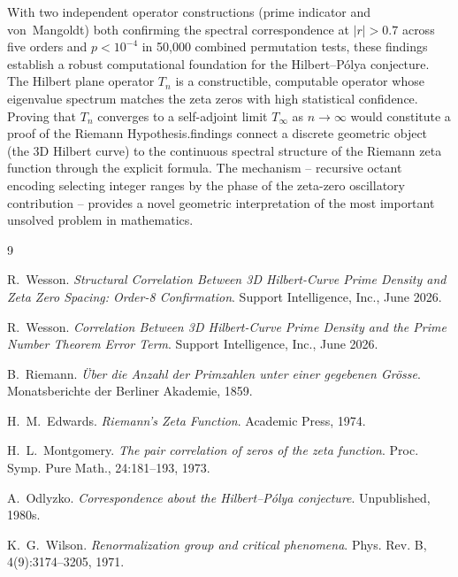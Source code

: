 \documentclass[11pt,a4paper]{article}
\begin{document}
With two independent operator constructions (prime indicator and von~Mangoldt) both confirming the spectral correspondence at $|r| > 0.7$ across five orders and $p < 10^{-4}$ in 50,000 combined permutation tests, these findings establish a robust computational foundation for the Hilbert--P\'{o}lya conjecture. The Hilbert plane operator $T_n$ is a constructible, computable operator whose eigenvalue spectrum matches the zeta zeros with high statistical confidence. Proving that $T_n$ converges to a self-adjoint limit $T_\infty$ as $n \to \infty$ would constitute a proof of the Riemann Hypothesis.\n\nThese findings connect a discrete geometric object (the 3D Hilbert curve)
to the continuous spectral structure of the Riemann zeta function through
the explicit formula. The mechanism -- recursive octant encoding selecting
integer ranges by the phase of the zeta-zero oscillatory contribution --
provides a novel geometric interpretation of the most important unsolved
problem in mathematics.

\begin{thebibliography}{9}

R.~Wesson.
\emph{Structural Correlation Between 3D Hilbert-Curve Prime Density and
Zeta Zero Spacing: Order-8 Confirmation}.
Support Intelligence, Inc., June 2026.

R.~Wesson.
\emph{Correlation Between 3D Hilbert-Curve Prime Density and the Prime
Number Theorem Error Term}.
Support Intelligence, Inc., June 2026.

B.~Riemann.
\emph{\"Uber die Anzahl der Primzahlen unter einer gegebenen Gr\"osse}.
Monatsberichte der Berliner Akademie, 1859.

H.~M.~Edwards.
\emph{Riemann's Zeta Function}.
Academic Press, 1974.

H.~L.~Montgomery.
\emph{The pair correlation of zeros of the zeta function}.
Proc. Symp. Pure Math., 24:181--193, 1973.

A.~Odlyzko.
\emph{Correspondence about the Hilbert--P\'{o}lya conjecture}.
Unpublished, 1980s.

K.~G.~Wilson.
\emph{Renormalization group and critical phenomena}.
Phys. Rev. B, 4(9):3174--3205, 1971.

\end{thebibliography}
\end{document}
